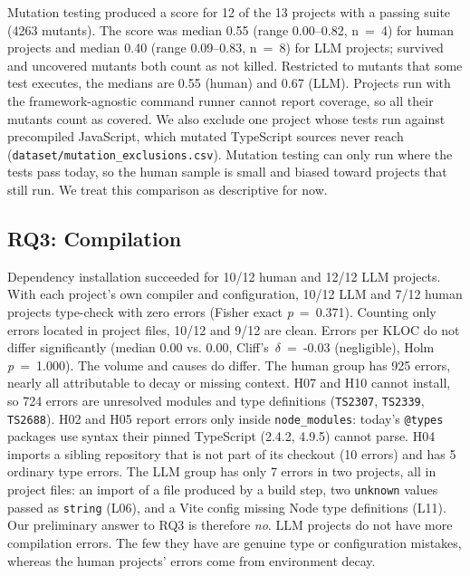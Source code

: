 \documentclass[10pt,conference]{IEEEtran}
\begin{document}
Mutation testing produced a score for 12 of the 13 projects with a passing suite (4263 mutants). The score was median 0.55 (range 0.00--0.82, n~=~4) for human projects and median 0.40 (range 0.09--0.83, n~=~8) for LLM projects; survived and uncovered mutants both count as not killed. Restricted to mutants that some test executes, the medians are 0.55 (human) and 0.67 (LLM). Projects run with the framework-agnostic command runner cannot report coverage, so all their mutants count as covered. We also exclude one project whose tests run against precompiled JavaScript, which mutated TypeScript sources never reach (\texttt{dataset/mutation\_exclusions.csv}). Mutation testing can only run where the tests pass today, so the human sample is small and biased toward projects that still run. We treat this comparison as descriptive for now.

\subsection{RQ3: Compilation}
Dependency installation succeeded for 10/12 human and 12/12 LLM projects. With each project's own compiler and configuration, 10/12 LLM and 7/12 human projects type-check with zero errors (Fisher exact \emph{p}~=~0.371). Counting only errors located in project files, 10/12 and 9/12 are clean. Errors per KLOC do not differ significantly (median 0.00 vs. 0.00, Cliff's~$\delta$~=~-0.03 (negligible), Holm \emph{p}~=~1.000). The volume and causes do differ. The human group has 925 errors, nearly all attributable to decay or missing context. H07 and H10 cannot install, so 724 errors are unresolved modules and type definitions (\texttt{TS2307}, \texttt{TS2339}, \texttt{TS2688}). H02 and H05 report errors only inside \texttt{node\_modules}: today's \texttt{@types} packages use syntax their pinned TypeScript (2.4.2, 4.9.5) cannot parse. H04 imports a sibling repository that is not part of its checkout (10 errors) and has 5 ordinary type errors. The LLM group has only 7 errors in two projects, all in project files: an import of a file produced by a build step, two \texttt{unknown} values passed as \texttt{string} (L06), and a Vite config missing Node type definitions (L11). Our preliminary answer to RQ3 is therefore \emph{no}. LLM projects do not have more compilation errors. The few they have are genuine type or configuration mistakes, whereas the human projects' errors come from environment decay.
\end{document}
